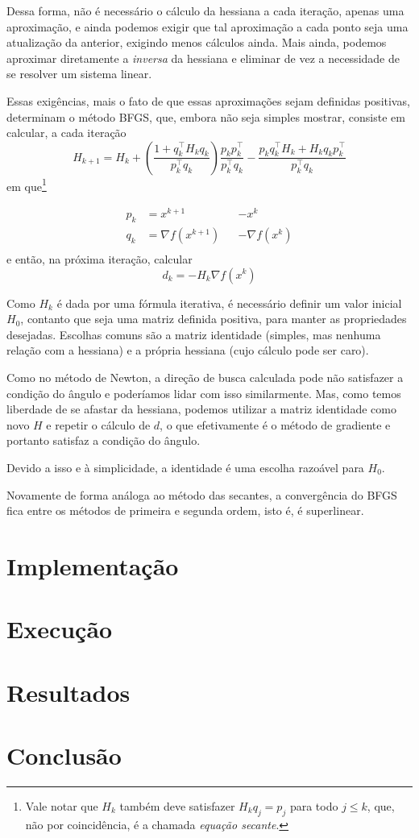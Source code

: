 \documentclass[a4paper,11pt]{article}
\begin{document}
            Dessa forma, não é necessário o cálculo da hessiana a cada iteração, apenas uma aproximação, e ainda podemos exigir que tal aproximação
            a cada ponto seja uma atualização da anterior, exigindo menos cálculos ainda. Mais ainda, podemos aproximar diretamente a \emph{inversa}
            da hessiana e eliminar de vez a necessidade de se resolver um sistema linear.

            Essas exigências, mais o fato de que essas aproximações sejam definidas positivas, determinam o método BFGS, que, embora não seja
            simples mostrar, consiste em calcular, a cada iteração
                $$ H_{k+1} = H_k + \left( \frac{1 + q_k^\top H_kq_k}{p_k^\top q_k}\right)\frac{p_kp_k^\top}{p_k^\top q_k} - \frac{p_kq_k^\top H_k + H_kq_kp_k^\top}{p_k^\top q_k}$$
            em que\footnote{Vale notar que $H_k$ também deve satisfazer $H_kq_j = p_j$ para todo $j \leq k$, que, não por coincidência, é a chamada \emph{equação secante}.}

                \begin{equation*}
                    \begin{aligned}
                        p_k &= x^{k+1} & &- x^k \\
                        q_k &= \nabla f(x^{k+1}) & &- \nabla f(x^k) \\
                    \end{aligned}
                \end{equation*}
            e então, na próxima iteração, calcular
                $$ d_k = -H_k\nabla f(x^k) $$

            Como $H_k$ é dada por uma fórmula iterativa, é necessário definir um valor inicial $H_0$, contanto que seja uma matriz definida positiva, para manter as propriedades desejadas. Escolhas comuns são a matriz identidade (simples, mas nenhuma relação com a hessiana) e a própria hessiana (cujo cálculo pode ser caro).

            Como no método de Newton, a direção de busca calculada pode não satisfazer a condição do ângulo e poderíamos lidar com isso similarmente. Mas, como temos liberdade de se afastar da hessiana, podemos utilizar a matriz identidade como novo $H$ e repetir o cálculo de $d$, o que efetivamente é o método de gradiente e portanto satisfaz a condição do ângulo.

            Devido a isso e à simplicidade, a identidade é uma escolha razoável para $H_0$.

            Novamente de forma análoga ao método das secantes, a convergência do BFGS fica entre os métodos de primeira e segunda ordem, isto é, é superlinear.
    \section*{Implementação}
    \section*{Execução}
    \section*{Resultados}
    \section*{Conclusão}
\end{document}
